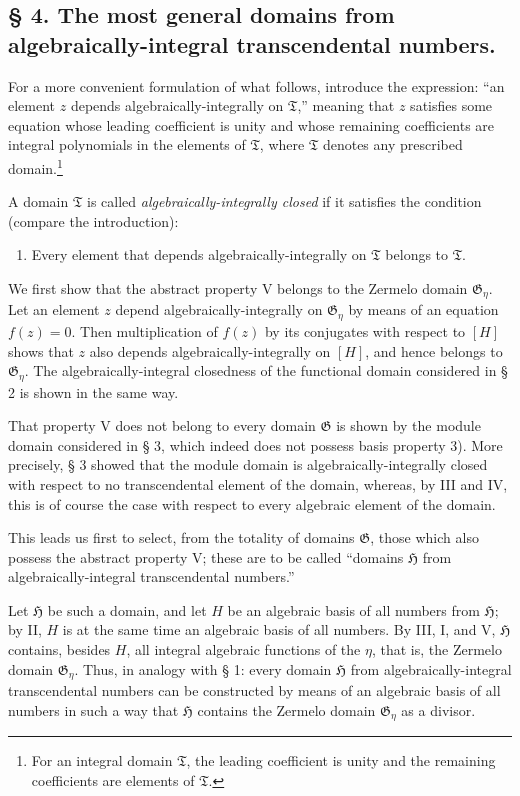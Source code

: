 \documentclass[11pt]{article}
\begin{document}
\subsection*{§ 4. The most general domains from algebraically-integral
transcendental numbers.}

For a more convenient formulation of what follows, introduce the expression:
``an element $z$ depends algebraically-integrally on $\mathfrak T$,'' meaning
that $z$ satisfies some equation whose leading coefficient is unity and whose
remaining coefficients are integral polynomials in the elements of $\mathfrak T$,
where $\mathfrak T$ denotes any prescribed domain.\footnote{For an integral
domain $\mathfrak T$, the leading coefficient is unity and the remaining
coefficients are elements of $\mathfrak T$.}

A domain $\mathfrak T$ is called \emph{algebraically-integrally closed} if it
satisfies the condition (compare the introduction):
\begin{enumerate}
\item[V.] Every element that depends algebraically-integrally on $\mathfrak T$
belongs to $\mathfrak T$.
\end{enumerate}

We first show that the abstract property V belongs to the Zermelo domain
$\mathfrak G_\eta$. Let an element $z$ depend algebraically-integrally on
$\mathfrak G_\eta$ by means of an equation $f(z)=0$. Then multiplication of
$f(z)$ by its conjugates with respect to $[H]$ shows that $z$ also depends
algebraically-integrally on $[H]$, and hence belongs to $\mathfrak G_\eta$.
The algebraically-integral closedness of the functional domain considered in § 2
is shown in the same way.

That property V does not belong to every domain $\mathfrak G$ is shown by the
module domain considered in § 3, which indeed does not possess basis property 3).
More precisely, § 3 showed that the module domain is algebraically-integrally
closed with respect to no transcendental element of the domain, whereas, by III
and IV, this is of course the case with respect to every algebraic element of the
domain.

This leads us first to select, from the totality of domains $\mathfrak G$, those
which also possess the abstract property V; these are to be called ``domains
$\mathfrak H$ from algebraically-integral transcendental numbers.''

Let $\mathfrak H$ be such a domain, and let $H$ be an algebraic basis of all
numbers from $\mathfrak H$; by II, $H$ is at the same time an algebraic basis of
all numbers. By III, I, and V, $\mathfrak H$ contains, besides $H$, all integral
algebraic functions of the $\eta$, that is, the Zermelo domain
$\mathfrak G_\eta$. Thus, in analogy with § 1: every domain $\mathfrak H$ from
algebraically-integral transcendental numbers can be constructed by means of an
algebraic basis of all numbers in such a way that $\mathfrak H$ contains the
Zermelo domain $\mathfrak G_\eta$ as a divisor.
\end{document}
